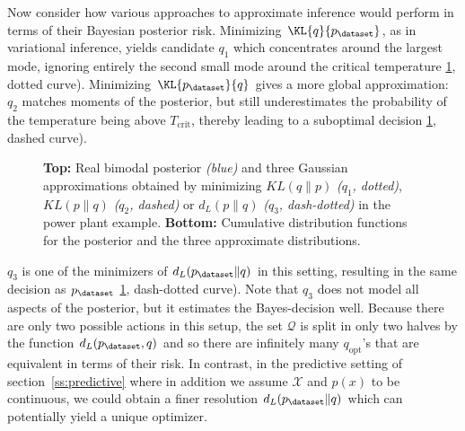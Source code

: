 Now consider how various approaches to approximate inference would perform in terms of their Bayesian posterior risk. Minimizing $\KL{q}{p_\dataset}$, as in variational inference, yields candidate $q_1$ which concentrates around the largest mode, ignoring entirely the second small mode around the critical temperature \ref{fig:toy}, dotted curve). Minimizing $\KL{p_\dataset}{q}$ gives a more global approximation: $q_2$ matches moments of the posterior, but still underestimates the probability of the temperature being above $T_\mathrm{crit}$, thereby leading to a suboptimal decision \ref{fig:toy}, dashed curve).

\begin{figure}[bt]
\centering
{}
 \caption[Illustrating of approximate inference in a loss-critical toy example]{\textbf{Top:} Real bimodal posterior \emph{(blue)} and three Gaussian approximations obtained by minimizing  $KL(q\|p)$ \emph{($q_1$, dotted)}, $KL(p\|q)$ \emph{($q_2$, dashed)} or $d_L(p\|q)$ \emph{($q_3$, dash-dotted)} in the power plant example. \textbf{Bottom:} Cumulative distribution functions for the posterior and the three approximate distributions.}  \label{fig:toy}
\end{figure}

 $q_3$ is one of the minimizers of $d_L(p_\dataset \| q)$ in this setting, resulting in the same decision as $p_\dataset$ \ref{fig:toy}, dash-dotted curve). Note that $q_3$ does not model all aspects of the posterior, but it estimates the Bayes-decision well. Because there are only two possible actions in this setup, the set $\mathcal{Q}$ is split in only two halves by the function $d_L(p_\dataset,q)$ and so there are infinitely many $q_\mathrm{opt}$'s that are equivalent in terms of their risk. In contrast, in the predictive setting of section~\ref{ss:predictive} where in addition we assume $\mathcal{X}$ and $p(x)$ to be continuous, we could obtain a finer resolution $d_L(p_\dataset \| q)$ which can potentially yield a unique optimizer.

